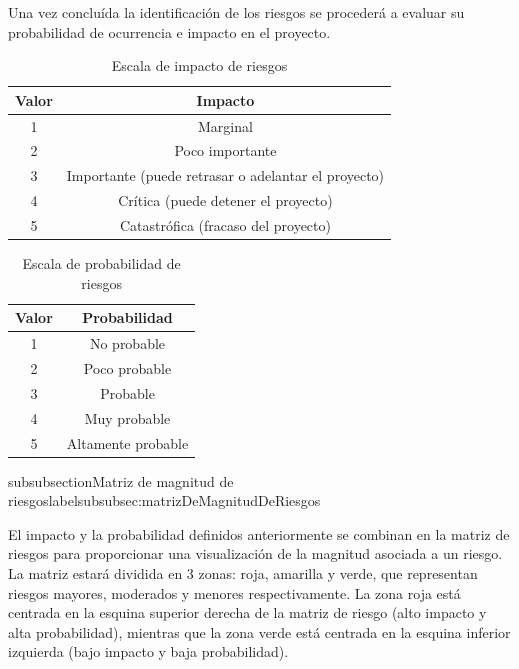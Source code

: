 Una vez concluída la identificación de los riesgos se procederá a evaluar su probabilidad de ocurrencia e impacto en el proyecto.


\begin{table}[H]
    \centering
    \begin{tabular}{|c|c|}
    \hline
    \textbf{Valor} & \textbf{Impacto} \\ \hline
    1 & Marginal \\ \hline
    2 & Poco importante \\ \hline
    3 & Importante (puede retrasar o adelantar el proyecto) \\ \hline
    4 & Crítica (puede detener el proyecto) \\ \hline
    5 & Catastrófica (fracaso del proyecto) \\ \hline
    \end{tabular}
    \caption{Escala de impacto de riesgos}
    \label{tab:escalaDeImpactoDeRiesgos}
\end{table}


\begin{table}[H]
    \centering
    \begin{tabular}{|c|c|}
    \hline
    \textbf{Valor} & \textbf{Probabilidad} \\ \hline
    1 & No probable \\ \hline
    2 & Poco probable \\ \hline
    3 & Probable \\ \hline
    4 & Muy probable \\ \hline
    5 & Altamente probable \\ \hline
    \end{tabular}
    \caption{Escala de probabilidad de riesgos}
    \label{tab:escalaDeProbabilidadDeRiesgos}
\end{table}

subsubsection{Matriz de magnitud de riesgos}label{subsubsec:matrizDeMagnitudDeRiesgos}

El impacto y la probabilidad definidos anteriormente se combinan en la matriz de riesgos para proporcionar una visualización de 
la magnitud asociada a un riesgo.
La matriz estará dividida en 3 zonas: roja, amarilla y verde, que representan riesgos mayores, moderados y menores respectivamente. 
La zona roja está centrada en la esquina superior derecha de la matriz de riesgo (alto impacto y alta probabilidad), mientras que la 
zona verde está centrada en la esquina inferior izquierda (bajo impacto y baja probabilidad). 

